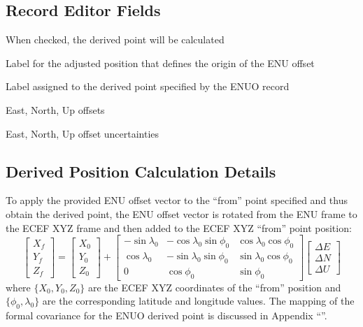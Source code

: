 \subsection*{Record Editor Fields}

\begin{description}[leftmargin=!,labelwidth=\widthof{\bfseries Positions:}]
\item[Enabled:] When checked, the derived point will be calculated
\item[From:] Label for the adjusted position that defines the origin of the ENU offset
\item[To:] Label assigned to the derived point specified by the ENUO record
\item[Delta E,N,U:] East, North, Up offsets
\item[Sigma E,N,U:] East, North, Up offset uncertainties
\end{description}

\subsection*{Derived Position Calculation Details}

To apply the provided ENU offset vector to the ``from'' point specified and thus obtain the derived point, the ENU offset vector is rotated from the ENU frame to the ECEF XYZ frame and then added to the ECEF XYZ ``from'' point position:
\begin{equation}
\left[\begin{array}{c}X_f\\Y_f\\Z_f\end{array}\right] = \left[\begin{array}{c}X_0\\Y_0\\Z_0\end{array}\right] + \left[\begin{array}{ccc}-\sin\lambda_0&-\cos\lambda_0\sin\phi_0&\cos\lambda_0\cos\phi_0\\\cos\lambda_0&-\sin\lambda_0\sin\phi_0&\sin\lambda_0\cos\phi_0\\0&\cos\phi_0&\sin\phi_0\end{array}\right] \left[\begin{array}{c}\Delta E\\\Delta N\\\Delta U\end{array}\right]
\end{equation}
where $\{X_0,Y_0,Z_0\}$ are the ECEF XYZ coordinates of the ``from'' position and $\{\phi_0,\lambda_0\}$ are the corresponding latitude and longitude values.  The mapping of the formal covariance for the ENUO derived point is discussed in Appendix ``''.

\newpage \ 
